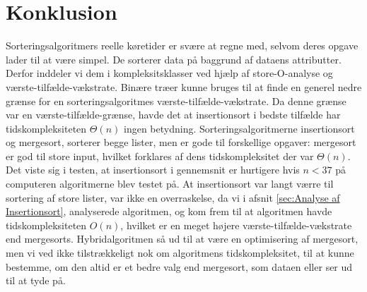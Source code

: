 \chapter{Konklusion}
\label{ch:Konklusion}

Sorteringsalgoritmers reelle køretider er svære at regne med, selvom deres opgave lader til at være simpel. De sorterer data på baggrund af dataens attributter. Derfor inddeler vi dem i kompleksitsklasser ved hjælp af store-O-analyse og værste-tilfælde-vækstrate. Binære træer kunne bruges til at finde en generel nedre grænse for en sorteringsalgoritmes værste-tilfælde-vækstrate. Da denne grænse var en værste-tilfælde-grænse, havde det at insertionsort i bedste tilfælde har tidskompleksiteten $\Theta (n)$ ingen betydning. Sorteringsalgoritmerne insertionsort og mergesort, sorterer begge lister, men er gode til forskellige opgaver: mergesort er god til store input, hvilket forklares af dens tidskompleksitet der var $\Theta (n)$. Det viste sig i testen, at insertionsort i gennemsnit er hurtigere hvis $n < 37$ på computeren algoritmerne blev testet på. At insertionsort var langt værre til sortering af store lister, var ikke en overraskelse, da vi i afsnit \ref{sec:Analyse af Insertionsort}, analyserede algoritmen, og kom frem til at algoritmen havde tidskompleksiteten $O(n)$, hvilket er en meget højere værste-tilfælde-vækstrate end mergesorts. Hybridalgoritmen så ud til at være en optimisering af mergesort, men vi ved ikke tilstrækkeligt nok om algoritmens tidskompleksitet, til at kunne bestemme, om den altid er et bedre valg end mergesort, som dataen eller ser ud til at tyde på.
